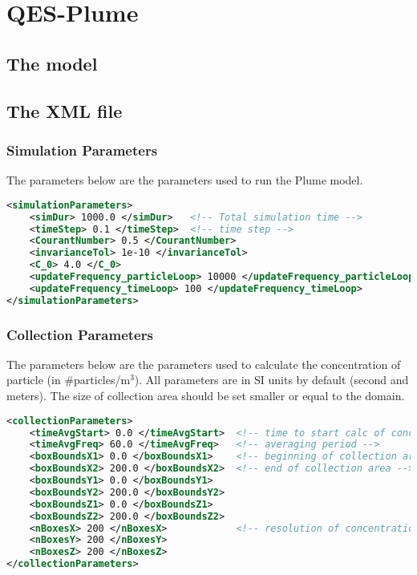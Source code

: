 \chapter{QES-Plume}

\section{The model}

\section{The XML file}

\subsection{Simulation Parameters}

The parameters below are the parameters used to run the Plume model.

\begin{lstlisting}[language=XML]
<simulationParameters>
    <simDur> 1000.0 </simDur>   <!-- Total simulation time -->
    <timeStep> 0.1 </timeStep>  <!-- time step -->
    <CourantNumber> 0.5 </CourantNumber>
    <invarianceTol> 1e-10 </invarianceTol>
    <C_0> 4.0 </C_0>
    <updateFrequency_particleLoop> 10000 </updateFrequency_particleLoop>
    <updateFrequency_timeLoop> 100 </updateFrequency_timeLoop>
</simulationParameters>
\end{lstlisting}

\subsection{Collection Parameters}

The parameters below are the parameters used to calculate the concentration of particle (in \#particles/m$^{3}$). All parameters are in SI units by default (second and meters). The size of collection area should be set smaller or equal to the domain.
\begin{lstlisting}[language=XML]
<collectionParameters>
    <timeAvgStart> 0.0 </timeAvgStart>  <!-- time to start calc of concentration -->
    <timeAvgFreq> 60.0 </timeAvgFreq>   <!-- averaging period -->
    <boxBoundsX1> 0.0 </boxBoundsX1>    <!-- beginning of collection area -->
    <boxBoundsX2> 200.0 </boxBoundsX2>  <!-- end of collection area -->
    <boxBoundsY1> 0.0 </boxBoundsY1>
    <boxBoundsY2> 200.0 </boxBoundsY2>
    <boxBoundsZ1> 0.0 </boxBoundsZ1>
    <boxBoundsZ2> 200.0 </boxBoundsZ2>
    <nBoxesX> 200 </nBoxesX>            <!-- resolution of concentration -->
    <nBoxesY> 200 </nBoxesY>
    <nBoxesZ> 200 </nBoxesZ>
</collectionParameters>
\end{lstlisting}

